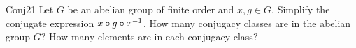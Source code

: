 %

%
%
%

\begin {exercise}{Conj21}
Let $G$ be an abelian group of finite order and $x,g\in G$.
Simplify the conjugate expression $x\circ g\circ x^{-1}$.  How many conjugacy classes are in the abelian group $G$? How many elements are in each conjugacy class? 
\end{exercise}


